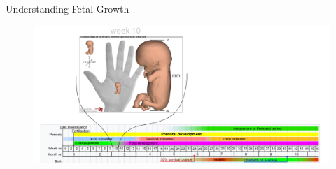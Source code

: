 {
\begin{frame}{Understanding Fetal Growth}
      \begin{figure}
        \centering
        \includegraphics[width=1.0\textwidth]{./../figures/fetal-size/versions/drawing-v02.png}
      \end{figure}
\end{frame}
}
